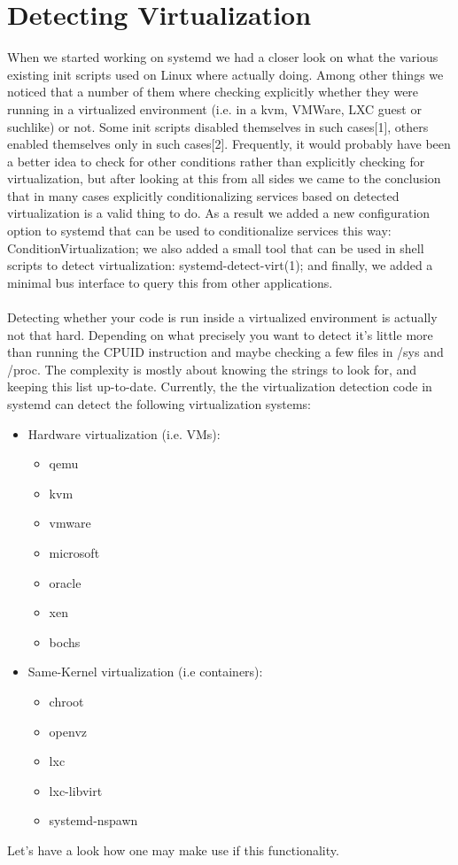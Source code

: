 \documentclass[titlepage]{article}
\begin{document}
\section{Detecting Virtualization}
When we started working on systemd we had a closer look on what the various existing init scripts used on Linux where actually doing. Among other things we noticed that a number of them where checking explicitly whether they were running in a virtualized environment (i.e. in a kvm, VMWare, LXC guest or suchlike) or not. Some init scripts disabled themselves in such cases[1], others enabled themselves only in such cases[2]. Frequently, it would probably have been a better idea to check for other conditions rather than explicitly checking for virtualization, but after looking at this from all sides we came to the conclusion that in many cases explicitly conditionalizing services based on detected virtualization is a valid thing to do. As a result we added a new configuration option to systemd that can be used to conditionalize services this way: ConditionVirtualization; we also added a small tool that can be used in shell scripts to detect virtualization: systemd-detect-virt(1); and finally, we added a minimal bus interface to query this from other applications.
\\
\\
Detecting whether your code is run inside a virtualized environment is actually not that hard. Depending on what precisely you want to detect it's little more than running the CPUID instruction and maybe checking a few files in /sys and /proc. The complexity is mostly about knowing the strings to look for, and keeping this list up-to-date. Currently, the the virtualization detection code in systemd can detect the following virtualization systems:
\begin{itemize}
    \item Hardware virtualization (i.e. VMs):
    \begin{itemize}
        \item qemu
        \item kvm
        \item vmware
        \item microsoft
        \item oracle
        \item xen
        \item bochs
    \end{itemize}
    \item Same-Kernel virtualization (i.e containers):
    \begin{itemize}
        \item chroot
        \item openvz
        \item lxc
        \item lxc-libvirt
        \item systemd-nspawn
    \end{itemize}
\end{itemize}
Let's have a look how one may make use if this functionality.
\end{document}
